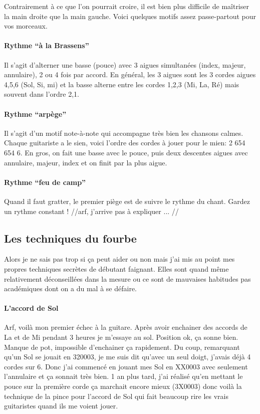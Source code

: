 \documentclass[a4paper,twoside]{article}
\begin{document}
Contrairement à ce que l'on pourrait croire, il est bien plus
difficile de maîtriser la main droite que la main gauche.
Voici quelques motifs assez passe-partout pour vos morceaux.

\paragraph{Rythme ``à la Brassens''} Il s'agit d'alterner une basse (pouce)
avec 3 aigues simultanées (index, majeur, annulaire), 2 ou 4 fois par
accord. En général, les 3 aigues sont les 3 cordes aigues 4,5,6 (Sol,
Si, mi) et la basse alterne entre les cordes 1,2,3 (Mi, La, Ré) mais
souvent dans l'ordre 2,1.

\paragraph{Rythme ``arpège''} Il s'agit d'un motif note-à-note qui
accompagne très bien les chansons calmes. Chaque guitariste a le
sien, voici l'ordre des cordes à jouer pour le mien: 2 654 654 6. En
gros, on fait une basse avec le pouce, puis deux descentes aigues avec
annulaire, majeur, index et on finit par la plus aigue.

\paragraph{Rythme ``feu de camp''} Quand il faut gratter, le premier
piège est de suivre le rythme du chant. Gardez un rythme constant !
//arf, j'arrive pas à expliquer ... //


\subsection{Les techniques du fourbe}

Alors je ne sais pas trop si ça peut aider ou non mais j'ai mis au
point mes propres techniques secrètes de débutant faignant. Elles sont
quand même relativement déconseillées dans la mesure ou ce sont de
mauvaises habitudes pas académiques dont on a du mal à se défaire.

\paragraph{L'accord de Sol}
Arf, voilà mon premier échec à la guitare. Après avoir enchainer des
accords de La et de Mi pendant 3 heures je m'essaye au sol. Position
ok, ça sonne bien. Manque de pot, impossible d'enchainer ça
rapidement.  Du coup, remarquant qu'un Sol se jouait en 320003, je me
suis dit qu'avec un seul doigt, j'avais déjà 4 cordes sur 6. Donc j'ai
commencé en jouant mes Sol en XX0003 avec seulement l'annulaire et ça
sonnait très bien. 1 an plus tard, j'ai réalisé qu'en mettant le pouce
sur la première corde ça marchait encore mieux (3X0003) donc voilà la
technique de la pince pour l'accord de Sol qui fait beaucoup rire les
vrais guitaristes quand ils me voient jouer.
\end{document}
